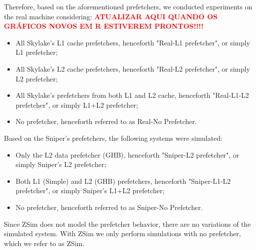 \documentclass[AMA,final,STIX1COL]{WileyNJD-v2}
\begin{document}
Therefore, based on the aforementioned prefetchers, we conducted experiments on the real machine considering: \textcolor{red}{\textbf{ATUALIZAR AQUI QUANDO OS GRÁFICOS NOVOS EM R ESTIVEREM PRONTOS!!!!}}
\begin{itemize}
    \item All Skylake's L1 cache prefetchers, henceforth "Real-L1 prefetcher", or simply L1 prefetcher;
    \item All Skylake's L2 cache prefetchers, henceforth "Real-L2 prefetcher", or simply L2 prefetcher;
    \item All Skylake's prefetchers from both L1 and L2 cache, henceforth "Real-L1-L2 prefetcher", or simply L1+L2 prefetcher;
    \item No prefetcher, henceforth referred to as Real-No Prefetcher.
\end{itemize}

Based on the Sniper's prefetchers, the following systems were simulated:
\begin{itemize}
    \item Only the L2 data prefetcher (GHB), henceforth "Sniper-L2 prefetcher", or simply Sniper's L2 prefetcher;
    \item Both L1 (Simple) and L2 (GHB) prefetchers, henceforth "Sniper-L1-L2 prefetcher", or simply Sniper's L1+L2 prefetcher;
    \item No prefetcher, henceforth referred to as Sniper-No Prefetcher.
\end{itemize}

Since ZSim does not model the prefetcher behavior, there are no variations of the simulated system. With ZSim we only perform simulations with no prefetcher, which we refer to as ZSim.
\end{document}
